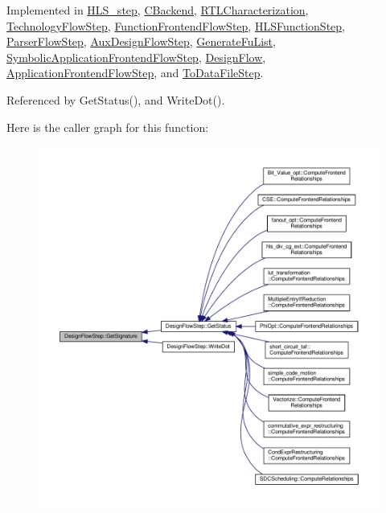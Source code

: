 Implemented in \hyperlink{classHLS__step_a93c15724812bc99bccd3c57bcb680295}{H\+L\+S\+\_\+step}, \hyperlink{classCBackend_aa66a47377656d5f70e26c4dd96de7ab6}{C\+Backend}, \hyperlink{classRTLCharacterization_a04f2b9b10118caba1e50a27769445f21}{R\+T\+L\+Characterization}, \hyperlink{classTechnologyFlowStep_a56b1c17014e131852e07a52bceee38e0}{Technology\+Flow\+Step}, \hyperlink{classFunctionFrontendFlowStep_a89e3f6d142de8aacb36eeb7b3f3d5ad8}{Function\+Frontend\+Flow\+Step}, \hyperlink{classHLSFunctionStep_a8f40b68d392790017292410850088887}{H\+L\+S\+Function\+Step}, \hyperlink{classParserFlowStep_aa20842b21ed80673edb2fc8a664cc9b6}{Parser\+Flow\+Step}, \hyperlink{classAuxDesignFlowStep_a0ed46b87b6526026f9b405f35ba06244}{Aux\+Design\+Flow\+Step}, \hyperlink{classGenerateFuList_a7bd13ddbc7a4b82d834a9cd0812d4b90}{Generate\+Fu\+List}, \hyperlink{classSymbolicApplicationFrontendFlowStep_a556a719569a45bfc5f3554c1cc7558c3}{Symbolic\+Application\+Frontend\+Flow\+Step}, \hyperlink{classDesignFlow_a0cfc751e3c286071ffb473e1165e1f46}{Design\+Flow}, \hyperlink{classApplicationFrontendFlowStep_a25500677dc27a20d35bdb4b45bfdba42}{Application\+Frontend\+Flow\+Step}, and \hyperlink{classToDataFileStep_ad4d235d11fd907c9d593f73e55609022}{To\+Data\+File\+Step}.



Referenced by Get\+Status(), and Write\+Dot().

Here is the caller graph for this function\+:
\nopagebreak
\begin{figure}[H]
\begin{center}
\leavevmode
\includegraphics[width=350pt]{d3/da9/classDesignFlowStep_ab111e3d4058615c2dedc0505978d4699_icgraph}
\end{center}
\end{figure}
\mbox{\label{classDesignFlowStep_a489f53821a358e1d67dd0cfc042bd496}} 
